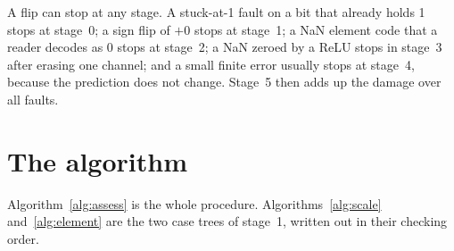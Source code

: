 \documentclass[10pt,a4paper]{article}
\begin{document}
\begin{center}
\end{center}

A flip can stop at any stage. A stuck-at-1 fault on a bit that already holds 1 stops at stage~0;
a sign flip of $+0$ stops at stage~1; a NaN element code that a reader decodes as 0 stops at
stage~2; a NaN zeroed by a ReLU stops in stage~3 after erasing one channel; and a small finite
error usually stops at stage~4, because the prediction does not change. Stage~5 then adds up
the damage over all faults.

\section{The algorithm}

Algorithm~\ref{alg:assess} is the whole procedure. Algorithms~\ref{alg:scale}
and~\ref{alg:element} are the two case trees of stage~1, written out in their checking order.
\end{document}
